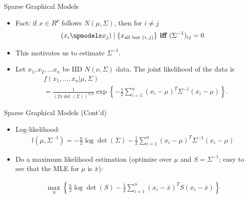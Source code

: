 \documentclass[12pt]{beamer}
\newcommand{\1}[1]{{\mathbf 1}\left\{#1\right\}}        %
\def\lp{\left(}
\def\rp{\right)}
\begin{document}
\begin{frame}[fragile]{Sparse Graphical Models}

\begin{itemize}[<+->]
\item Fact: if $x\in R^p$ follows $N(\mu,\Sigma)$, then for $i\ne j$
\begin{align*}
(x_i  \upmodels %
x_j )\mid \{x_{\text{all but $(i,j)$}}\} \textbf{ iff } (\Sigma^{-1})_{ij}=0
\end{align*}
\item This motivates us to estimate $\Sigma^{-1}$.
\item Let $x_1,x_2,...x_n$ be IID $N(\nu,\Sigma)$ data. The joint likelihood of the data is
\begin{align*}
& f(x_1, \dots, x_n|\mu,\Sigma) 
\\&= \frac{1}{(2\pi \det\lp \Sigma\rp)^{n/2}}\exp\left\{ -\frac{1}{2} \sum_{i=1}^n(x_i-\mu)^T\Sigma^{-1}(x_i-\mu) \right\}.
\end{align*}

\end{itemize}

\end{frame}


\begin{frame}[fragile]{Sparse Graphical Models (Cont'd)}

\begin{itemize}[<+->]
\item  Log-likelihood:
\begin{align*}
l(\mu,\Sigma^{-1}) = -\frac{n}{2}\log \det \lp \Sigma \rp  -\frac{1}{2} \sum_{i=1}^n(x_i-\mu)^T\Sigma^{-1}(x_i-\mu)
\end{align*}

\item Do a maximum likelihood estimation (optimize over $\mu$ and $S = \Sigma^{-1}$; easy to see that the MLE for $\mu$ is $\bar{x}$):

\begin{align*}
\max_S\left\{  \frac{n}{2}\log \det\lp S \rp  -\frac{1}{2} \sum_{i=1}^n(x_i-\bar{x})^T S (x_i-\bar{x})\right\} 
\end{align*}


\end{itemize}

\end{frame}
\end{document}

